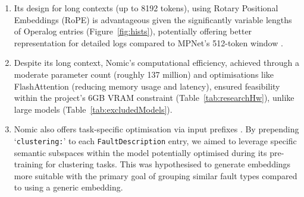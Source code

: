 \documentclass[10pt,oneside]{report}
\begin{document}
\begin{enumerate}
    
    \item Its design for long contexts (up to 8192 tokens), using Rotary Positional Embeddings (RoPE) \cite{su2024roformer} is advantageous given the significantly variable lengths of Operalog entries (Figure~\ref{fig:hists}), potentially offering better representation for detailed logs compared to MPNet's 512-token window \cite{song2020mpnet}. 


    \item Despite its long context, Nomic's computational efficiency, achieved through a moderate parameter count (roughly 137 million) and optimisations like FlashAttention \cite{dao2022flashattention} (reducing memory usage and latency), ensured feasibility within the project's 6GB VRAM constraint (Table~\ref{tab:researchHw}), unlike large models (Table~\ref{tab:excludedModels}).

    \item Nomic also offers task-specific optimisation via input prefixes \cite{nussbaum2024nomic}. By prepending `\texttt{clustering:}' to each \texttt{FaultDescription} entry, we aimed to leverage specific semantic subspaces within the model potentially optimised during its pre-training for clustering tasks. This was hypothesised to generate embeddings more suitable with the primary goal of grouping similar fault types compared to using a generic embedding.


\end{enumerate}
\end{document}
